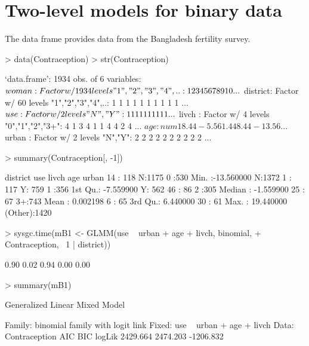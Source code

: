 \documentclass[12pt]{article}
\begin{document}
\section{Two-level models for binary data}
\label{sec:TwolevelBinary}

The data frame  provides data from the
Bangladesh fertility survey.
\begin{Schunk}
\begin{Sinput}
> data(Contraception)
> str(Contraception)
\end{Sinput}
\begin{Soutput}
`data.frame':	1934 obs. of  6 variables:
 $ woman   : Factor w/ 1934 levels "1","2","3","4",..: 1 2 3 4 5 6 7 8 9 10 ...
 $ district: Factor w/ 60 levels "1","2","3","4",..: 1 1 1 1 1 1 1 1 1 1 ...
 $ use     : Factor w/ 2 levels "N","Y": 1 1 1 1 1 1 1 1 1 1 ...
 $ livch   : Factor w/ 4 levels "0","1","2","3+": 4 1 3 4 1 1 4 4 2 4 ...
 $ age     : num   18.44  -5.56   1.44   8.44 -13.56 ...
 $ urban   : Factor w/ 2 levels "N","Y": 2 2 2 2 2 2 2 2 2 2 ...
\end{Soutput}
\begin{Sinput}
> summary(Contraception[, -1])
\end{Sinput}
\begin{Soutput}
    district    use      livch         age             urban   
 14     : 118   N:1175   0 :530   Min.   :-13.560000   N:1372  
 1      : 117   Y: 759   1 :356   1st Qu.: -7.559900   Y: 562  
 46     :  86            2 :305   Median : -1.559900           
 25     :  67            3+:743   Mean   :  0.002198           
 6      :  65                     3rd Qu.:  6.440000           
 30     :  61                     Max.   : 19.440000           
 (Other):1420                                                  
\end{Soutput}
\begin{Sinput}
> sysgc.time(mB1 <- GLMM(use ~ urban + age + livch, binomial, 
+     Contraception, ~1 | district))
\end{Sinput}
\begin{Soutput}
[1] 0.90 0.02 0.94 0.00 0.00
\end{Soutput}
\begin{Sinput}
> summary(mB1)
\end{Sinput}
\begin{Soutput}
Generalized Linear Mixed Model

Family: binomial family with logit link
Fixed: use ~ urban + age + livch 
Data: Contraception 
      AIC      BIC    logLik
 2429.664 2474.203 -1206.832


\end{Soutput}
\end{Schunk}
\end{document}
